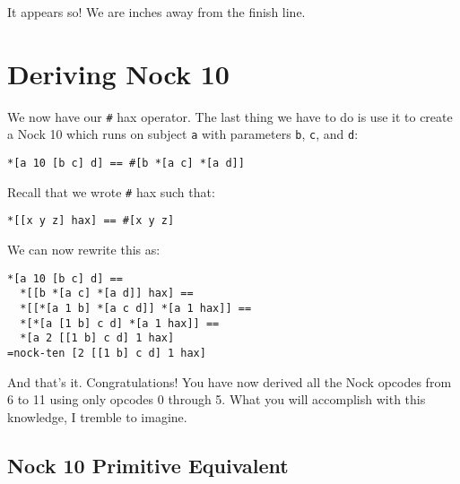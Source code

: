 \documentclass[twoside]{article}
\begin{document}
It appears so! We are inches away from the finish line.

\section{Deriving Nock 10}

We now have our \lstinline[style=inlinecode]{#} hax operator. The last thing we have to do is use it to create a Nock 10 which runs on subject \lstinline[style=inlinecode]{a} with parameters \lstinline[style=inlinecode]{b}, \lstinline[style=inlinecode]{c}, and \lstinline[style=inlinecode]{d}:

\begin{lstlisting}[style=listingcode]
*[a 10 [b c] d] == #[b *[a c] *[a d]]
\end{lstlisting}

\noindent
Recall that we wrote \lstinline[style=inlinecode]{#} hax such that:

\begin{lstlisting}[style=listingblock]
*[[x y z] hax] == #[x y z]
\end{lstlisting}

\noindent
We can now rewrite this as:

\begin{lstlisting}[style=listingblock]
*[a 10 [b c] d] ==
  *[[b *[a c] *[a d]] hax] ==
  *[[*[a 1 b] *[a c d]] *[a 1 hax]] ==
  *[*[a [1 b] c d] *[a 1 hax]] ==
  *[a 2 [[1 b] c d] 1 hax]
=nock-ten [2 [[1 b] c d] 1 hax]
\end{lstlisting}

\noindent
And that's it. Congratulations! You have now derived all the Nock opcodes from 6 to 11 using only opcodes 0 through 5. What you will accomplish with this knowledge, I tremble to imagine.

\newpage
\subsection*{Nock 10 Primitive Equivalent}
\end{document}
